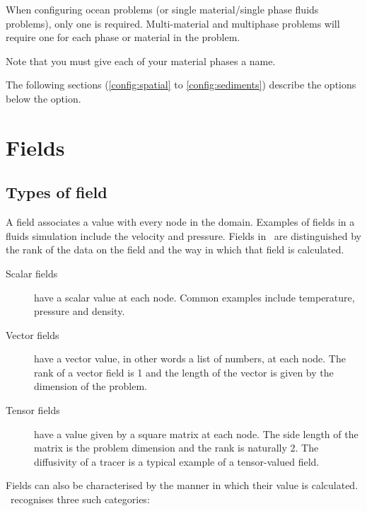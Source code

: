 When configuring ocean problems (or single material/single phase fluids
problems), only one  is required.  Multi-material
and multiphase problems will require one  for each
phase or material in the problem.

Note that you must give each of your material phases a name.

The following sections (\ref{config:spatial} to \ref{config:sediments}) describe the options below the
 option.

\section{Fields}
\subsection{Types of field}

A field associates a value with every node in the domain. Examples of fields
in a fluids simulation include the velocity and pressure. Fields in \fluidity\
are distinguished by the rank of the data on the field and the way in which
that field is calculated.

\begin{description}
\item[Scalar fields] have a scalar value at each node. Common examples
  include temperature, pressure and density.
\item[Vector fields] have a vector value, in other words a list of numbers,
  at each node. The rank of a vector field is 1 and the length of the
  vector is given by the dimension of the problem.
\item[Tensor fields] have a value given by a square matrix at each
  node. The side length of the matrix is the problem dimension and the rank
  is naturally 2. The diffusivity of a tracer is a typical example of a
  tensor-valued field.
\end{description}

Fields can also be characterised by the manner in which their value is
calculated. \fluidity\ recognises three such categories:

